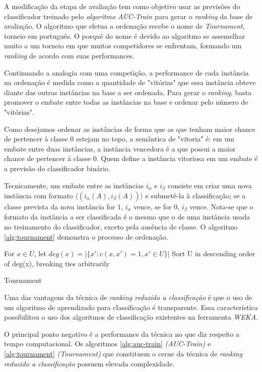 A modificação da etapa de avaliação tem como objetivo usar as previsões do classificador treinado pelo \emph{algoritmo \emph{AUC-Train}} para gerar o \emph{ranking} da base de avaliação. O algoritmo que efetua a ordenação recebe o nome de \emph{Tournament}, torneio em português. O porquê do nome é devido ao algoritmo se assemelhar muito a um torneio em que muitos competidores se enfrentam, formando um \emph{ranking} de acordo com suas performances.

Continuando a analogia com uma competição, a performance de cada instância na ordenação é medida como a quantidade de "vitórias" que essa instância obteve diante das outras instâncias na base a ser ordenada. Para gerar o \emph{ranking}, basta promover o embate entre todas as instâncias na base e ordenar pelo número de "vitórias".

Como desejamos ordenar as instâncias de forma que as que tenham maior chance de pertencer à classe $0$ estejam no topo, a semântica de "vitoria" é: em um embate entre duas instâncias, a instância vencedora é a que possui a maior chance de pertencer à classe $0$. Quem define a instância vitoriosa em um embate é a previsão do classificador binário.

Tecnicamente, um embate entre as instâncias $i_\alpha$ e $i_\beta$ consiste em criar uma nova instância com formato $\langle (i_{\alpha}(A), i_{\beta}(A))\rangle$ e submetê-la à classificação; se a classe prevista da nova instância for $1$, $i_{\alpha}$ vence, se for $0$, $i_{\beta}$ vence. Nota-se que o formato da instância a ser classificada é o mesmo que o de uma instância usada no treinamento do classificador, exceto pela ausência de classe. O algoritmo \ref{alg:tournament} demonstra o processo de ordenação.

\begin{algorithm}[h!]
    For $x \in U$, let $deg(x) = |\{x':c(x, x') = 1, x' \in U\}|$\;
    Sort U in descending order of deg(x), breaking ties arbitrarily
    
    \caption{Tournament}
    \label{alg:tournament}
\end{algorithm}

Uma das vantagens da técnica de \emph{ranking reduzido a classificação} é que o uso de um algoritmo de aprendizado para classificação é transparente. Essa característica possibilitou o uso dos algoritmos de classificação existentes na ferramenta \emph{WEKA}.

O principal ponto negativo é a performance da técnica no que diz respeito a tempo computacional. Os algoritmos \ref{alg:auc-train} \emph{(AUC-Train)} e \ref{alg:tournament} \emph{(Tournament)} que constituem o cerne da técnica de \emph{ranking reduzido a classificação} possuem elevada complexidade.

